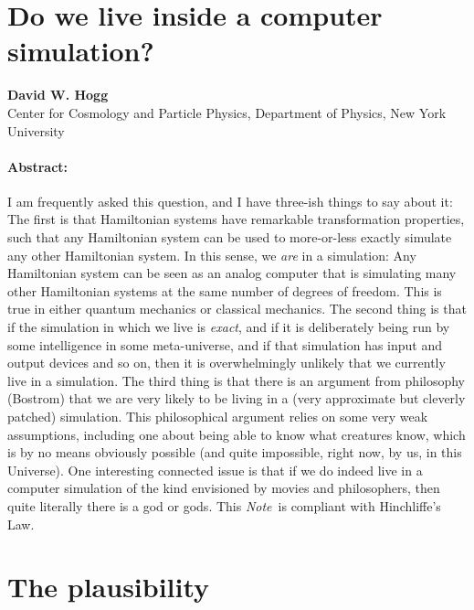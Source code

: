 \documentclass[12pt,letterpaper]{article}
\newcommand{\documentname}{\textsl{Note}}
\begin{document}
\section*{Do we live inside a computer simulation?}

\noindent
\textbf{David W. Hogg}\\
{\footnotesize{Center for Cosmology and Particle Physics, Department of Physics, New York University}}

\paragraph{Abstract:}
I am frequently asked this question, and I have three-ish things to
say about it:
The first is that Hamiltonian systems have remarkable transformation
properties, such that any Hamiltonian system can be used to
more-or-less exactly simulate any other Hamiltonian system.
In this sense, we \emph{are} in a simulation:
Any Hamiltonian system can be seen as an analog computer that is
simulating many other Hamiltonian systems at the same number of
degrees of freedom.
This is true in either quantum mechanics or classical mechanics.
The second thing is that if the simulation in which we live is
\emph{exact}, and if it is deliberately being run by some intelligence
in some meta-universe, and if that simulation has input and output
devices and so on, then it is overwhelmingly unlikely that we
currently live in a simulation.
The third thing is that there is an argument from philosophy (Bostrom)
that we are very likely to be living in a (very approximate but
cleverly patched) simulation.
This philosophical argument relies on some very weak assumptions,
including one about being able to know what creatures know, which is
by no means obviously possible (and quite impossible, right now, by
us, in this Universe).
One interesting connected issue is that if we do indeed live in a
computer simulation of the kind envisioned by movies and philosophers,
then quite literally there is a god or gods.
This \documentname\ is compliant with Hinchliffe's Law.

\section{The plausibility}
\end{document}
